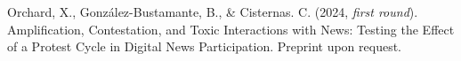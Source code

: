 \begin{publications}
\begin{benumerate}{8}

\item{Orchard, X., González-Bustamante, B., \& Cisternas. C. (2024, {\itshape first round}). Amplification, Contestation, and Toxic Interactions with News: Testing the Effect of a Protest Cycle in Digital News Participation. Preprint upon request.}\vspace{1mm}

\end{benumerate}

\end{publications}

